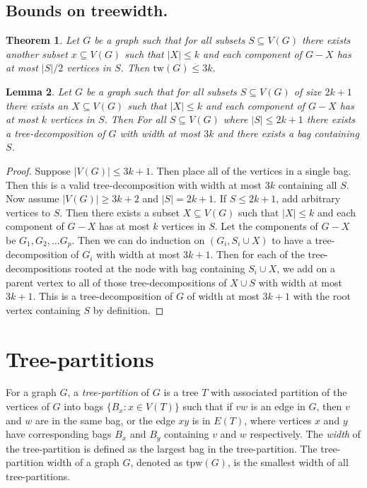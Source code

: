 \documentclass[]{article}
\newcommand{\tw}{\text{tw}}
\newtheorem{theorem}{Theorem}
\newtheorem{lemma}[theorem]{Lemma}
\theoremstyle{definition}
\numberwithin{theorem}{section}
\numberwithin{equation}{section}
\begin{document}
\subsection{Bounds on treewidth.}
\begin{theorem}
	Let $G$ be a graph such that for all subsets $S \subseteq V(G)$ there exists another subset $x \subseteq V(G)$ such that $|X| \leq k$ and each component of $G - X$ has at most $|S|/2$ vertices in $S$. Then $\tw(G) \leq 3k$. 
\end{theorem}

\begin{lemma}
	Let $G$ be a graph such that for all subsets $S \subseteq V(G)$ of size $2k + 1$ there exists an $X \subseteq V(G)$ such that $|X| \leq k$ and each component of $G - X$ has at most $k$ vertices in $S$. Then For all $S \subseteq V(G)$ where $|S| \leq 2k+1$ there exists a tree-decomposition of $G$ with width at most $3k$ and there exists a bag containing $S$. 
\end{lemma}
\begin{proof}
	Suppose $|V(G)| \leq 3k + 1$. Then place all of the vertices in a single bag. Then this is a valid tree-decomposition with width at most $3k$ containing all $S$. 
	Now assume $|V(G)| \geq 3k + 2$ and $|S| = 2k + 1$. If $S \leq 2k + 1$, add arbitrary vertices to $S$. Then there exists a subset $X \subseteq V(G)$ such that $|X| \leq k$ and each component of $G - X$ has at most $k$ vertices in $S$. Let the components of $G - X$ be $G_1, G_2, ... G_p$. Then we can do induction on $(G_i, S_i \cup X)$ to have a tree-decomposition of $G_i$ with width at most $3k + 1$. Then for each of the tree-decompositions rooted at the node with bag containing $S_i \cup X$, we add on a parent vertex to all of those tree-decompositions of $X \cup S$ with width at most $3k + 1$.  This is a tree-decomposition of $G$ of width at most $3k + 1$ with the root vertex containing $S$ by definition. 
\end{proof}

\section{Tree-partitions}
\newcommand{\tpw}{\text{tpw}}

For a graph $G$, a \textit{tree-partition} of $G$ is a tree $T$ with associated partition of the vertices of $G$ into bags $ \lbrace B_x : x \in V(T) \rbrace$ such that if $vw$ is an edge in $G$, then $v$ and $w$ are in the same bag, or the edge $xy$ is in $E(T)$, where vertices $x$ and $y$ have corresponding bags $B_x$ and $B_y$ containing $v$ and $w$ respectively. The \textit{width} of the tree-partition is defined as the largest bag in the tree-partition. The tree-partition width of a graph $G$, denoted as $\tpw(G)$, is the smallest width of all tree-partitions. 
\end{document}
